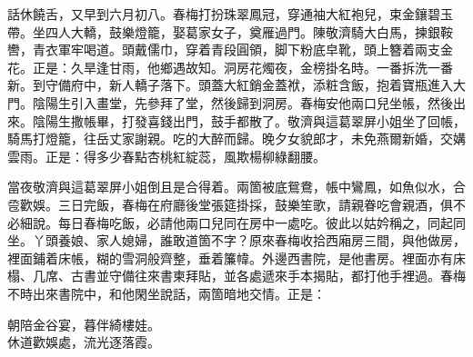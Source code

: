 話休饒舌，又早到六月初八。春梅打扮珠翠鳳冠，穿通袖大紅袍兒，束金鑲碧玉帶。坐四人大轎，鼓樂燈籠，娶葛家女子，奠雁過門。陳敬濟騎大白馬，揀銀鞍轡，青衣軍牢喝道。頭戴儒巾，穿着青段圓領，脚下粉底皁靴，頭上簪着兩支金花。正是：久旱逢甘雨，他鄉遇故知。洞房花燭夜，金榜掛名時。一番拆洗一番新。到守備府中，新人轎子落下。頭蓋大紅銷金蓋袱，添粧含飯，抱着寶瓶進入大門。陰陽生引入畫堂，先參拜了堂，然後歸到洞房。{}春梅安他兩口兒坐帳，然後出來。陰陽生撒帳畢，打發喜錢出門，鼓手都散了。敬濟與這葛翠屏小姐坐了回帳，騎馬打燈籠，往岳丈家謝親。吃的大醉而歸。晚夕女貌郎才，未免燕爾新婚，交媾雲雨。正是：得多少春點杏桃紅綻蕊，風欺楊柳綠翻腰。

當夜敬濟與這葛翠屏小姐倒且是合得着。兩箇被底鴛鴦，帳中鸞鳳，如魚似水，合卺歡娛。三日完飯，春梅在府廳後堂張筵掛採，鼓樂笙歌，請親眷吃會親酒，俱不必細說。每日春梅吃飯，必請他兩口兒同在房中一處吃。彼此以姑妗稱之，同起同坐。丫頭養娘、家人媳婦，誰敢道箇不字？原來春梅收拾西廂房三間，與他做房，裡面鋪着床帳，糊的雪洞般齊整，垂着簾幃。外邊西書院，是他書房。裡面亦有床榻、几席、古書並守備往來書柬拜貼，並各處遞來手本揭貼，都打他手裡過。春梅不時出來書院中，和他閑坐說話，兩箇暗地交情。正是：

\begin{myquote}
朝陪金谷宴，暮伴綺樓娃。\\休道歡娛處，流光逐落霞。
\end{myquote}

